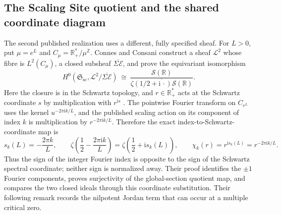 \subsection{The Scaling Site quotient and the shared coordinate diagram}

The second published realization uses a different, fully specified sheaf.
For \(L>0\), put \(\mu=e^L\) and
\(C_\mu=\mathbb R_+^*/\mu^{\mathbb Z}\).  Connes and Consani construct a
sheaf \(\mathcal L^2\) whose fibre is \(L^2(C_\mu)\), a closed subsheaf
\(\overline{\Sigma\mathcal E}\), and prove the equivariant isomorphism
\begin{equation}
\label{eq:spc-scaling-site-isomorphism}
 H^0\left(\mathfrak S_{\mathrm{sc}},
          \mathcal L^2/\overline{\Sigma\mathcal E}\right)
 \ \cong\ 
 \frac{\mathcal S(\mathbb R)}
 {\overline{\zeta(1/2+\mathrm i\,\cdot)\mathcal S(\mathbb R)}}.
\end{equation}
Here the closure is in the Schwartz topology, and \(r\in\mathbb R_+^*\)
acts at the Schwartz coordinate \(s\) by multiplication with \(r^{\mathrm is}\)
\cite[the theorem and proof on pp.~96--98]{connesConsani2023Hochschild}.
The pointwise Fourier transform on \(C_{e^L}\) uses the kernel
\(u^{-2\pi\mathrm ik/L}\), and the published scaling action on its component
of index \(k\) is multiplication by \(r^{-2\pi\mathrm ik/L}\).  Therefore the
exact index-to-Schwartz-coordinate map is
\begin{equation}
\label{eq:spc-signed-frequency-coordinate}
 s_k(L)=-\frac{2\pi k}{L},
 \qquad
 \zeta\left(\frac12-\frac{2\pi\mathrm ik}{L}\right)
 =\zeta\left(\frac12+\mathrm i s_k(L)\right),
 \qquad
 \chi_k(r)=r^{\mathrm i s_k(L)}=r^{-2\pi\mathrm ik/L}.
\end{equation}
Thus the sign of the integer Fourier index is opposite to the sign of the
Schwartz spectral coordinate; neither sign is normalized away.  Their proof
identifies the \(\pm1\) Fourier components, proves surjectivity of the
global-section quotient map, and compares the two closed ideals through this
coordinate substitution.  Their following remark records the nilpotent Jordan
term that can occur at a multiple critical zero.

